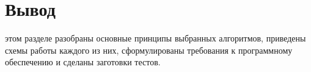 \section*{Вывод}
 этом разделе разобраны основные принципы выбранных алгоритмов, приведены схемы работы каждого из них, сформулированы требования к программному обеспечению и сделаны заготовки тестов.




























